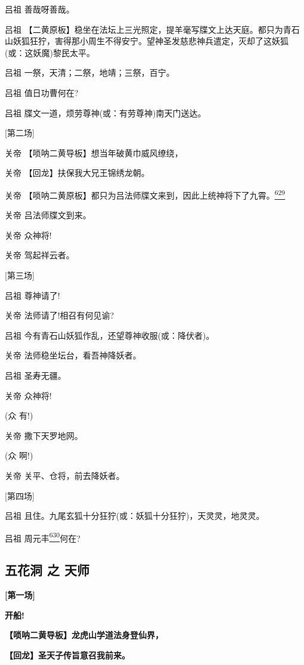 吕祖 善哉呀善哉。

吕祖
【二黄原板】稳坐在法坛上三光照定，提羊毫写牒文上达天庭。都只为青石山妖狐狂狞，害得那小周生不得安宁。望神圣发慈悲神兵遣定，灭却了这妖狐(或：这妖魔)黎民太平。

吕祖 一祭，天清；二祭，地靖；三祭，百宁。

吕祖 值日功曹何在?

吕祖 牒文一道，烦劳尊神(或：有劳尊神)南天门送达。

{[}第二场{]}

关帝 【唢呐二黄导板】想当年破黄巾威风缭绕，

关帝 【回龙】扶保我大兄王锦绣龙朝。

关帝
【唢呐二黄原板】都只为吕法师牒文来到，因此上统神将下了九霄。\protect\hyperlink{fn629}{\textsuperscript{629}}

关帝 吕法师牒文到来。

关帝 众神将!

关帝 驾起祥云者。

{[}第三场{]}

吕祖 尊神请了!

关帝 法师请了!相召有何见谕?

吕祖 今有青石山妖狐作乱，还望尊神收服(或：降伏者)。

关帝 法师稳坐坛台，看吾神降妖者。

吕祖 圣寿无疆。

关帝 众神将!

(众 有!)

关帝 撒下天罗地网。

(众 啊!)

关帝 关平、仓将，前去降妖者。

{[}第四场{]}

吕祖 且住。九尾玄狐十分狂狞(或：妖狐十分狂狞)，天灵灵，地灵灵。

吕祖 周元丰\protect\hyperlink{fn630}{\textsuperscript{630}}何在?

\hypertarget{ux4e94ux82b1ux6d1e-ux4e4b-ux5929ux5e08}{%
\subsection{五花洞 之
天师}\label{ux4e94ux82b1ux6d1e-ux4e4b-ux5929ux5e08}}

\textbf{{[}第一场{]}}

\textbf{开船!}

\textbf{【唢呐二黄导板】龙虎山学道法身登仙界，}

\textbf{【回龙】圣天子传旨意召我前来。}

